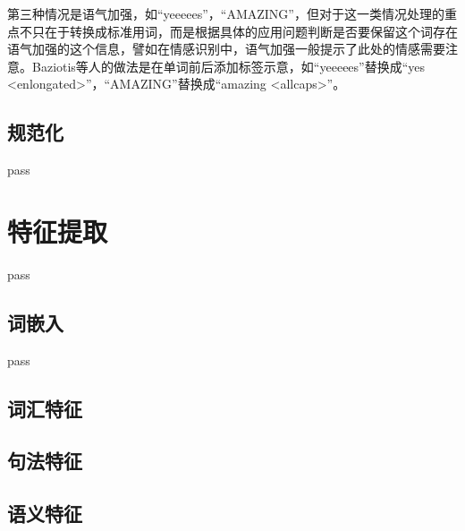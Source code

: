第三种情况是语气加强，如“yeeeees”，“AMAZING”，但对于这一类情况处理的重点不只在于转换成标准用词，而是根据具体的应用问题判断是否要保留这个词存在语气加强的这个信息，譬如在情感识别中，语气加强一般提示了此处的情感需要注意。Baziotis等人\cite{baziotis2017semeval2}的做法是在单词前后添加标签示意，如“yeeeees”替换成“yes <enlongated>”，“AMAZING”替换成“amazing <allcaps>”。

\subsection{规范化}

pass

\section{特征提取}

pass

\subsection{词嵌入}

pass

\subsection{词汇特征} %


\subsection{句法特征} %


\subsection{语义特征} %


